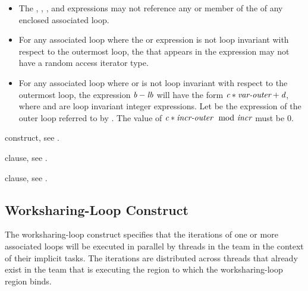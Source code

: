 \begin{itemize}
\item The , , , and  expressions
      may not reference any  or member of the  of
      any enclosed associated loop.
\item For any associated loop where the  or  expression is not loop
      invariant with respect to the outermost loop, the  that
      appears in the expression may not have a random access iterator type.
\item For any associated loop where  or  is not loop invariant
      with respect to the outermost loop, the expression $\plc{b}-\plc{lb}$
      will have the form $\plc{c}*\plc{var-outer}+\plc{d}$, where  and
       are loop invariant integer expressions. Let  be
      the  expression of the outer loop referred to by .  
      The value of $\plc{c}*\plc{incr-outer} \mod \plc{incr}$ must be 0.
\end{itemize}

\begin{crossrefs}
\item {} construct, see .

\item {} clause, see .

\item {} clause, see .
\end{crossrefs}



\subsection{Worksharing-Loop Construct}
\label{subsec:Worksharing-Loop Construct}
\summary
The worksharing-loop construct specifies that the iterations of one or more 
associated loops will be executed in parallel by threads in the team in the 
context of their implicit tasks. The iterations are distributed across threads 
that already exist in the team that is executing the  region 
to which the worksharing-loop region binds.

